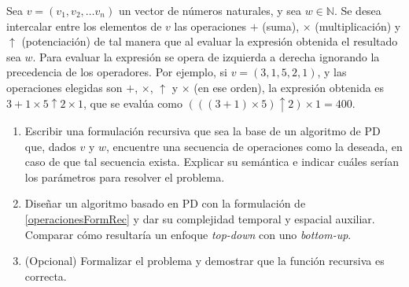 
\item Sea $v=(v_1, v_2, \ldots v_n)$ un vector de n\'umeros naturales, y sea $w \in \mathbb{N}$.
Se desea intercalar entre los elementos de $v$ las operaciones $+$ (suma), $\times$ (multiplicaci\'on) y $\uparrow$ (potenciaci\'on) de tal manera que al evaluar la expresi\'on obtenida el resultado sea $w$.
Para evaluar la expresi\'on se opera de izquierda a derecha ignorando la precedencia de los operadores.
Por ejemplo, si $v=(3, 1, 5, 2, 1)$, y las operaciones elegidas son $+$, $\times$, $\uparrow$ y $\times$ (en ese orden), la expresi\'on obtenida es $3 + 1 \times 5 \uparrow 2 \times 1$, que se evalúa como $(((3 + 1) \times 5) \uparrow 2) \times 1 = 400$.
\begin{enumerate}[label=$\alph*)$,ref=$\alph*)$]
\item Escribir una formulación recursiva que sea la base de un algoritmo de PD que, dados $v$ y $w$, encuentre una secuencia de operaciones como la deseada, en caso de que tal secuencia exista. Explicar su semántica e indicar cuáles serían los parámetros para resolver el problema.
\label{operacionesFormRec}
\item Dise\~nar un algoritmo basado en PD con la formulación de \ref{operacionesFormRec} y dar su complejidad temporal y espacial auxiliar. Comparar cómo resultaría un enfoque \textit{top-down} con uno \textit{bottom-up}.
\item (Opcional) Formalizar el problema y demostrar que la función recursiva es correcta.
\end{enumerate}





